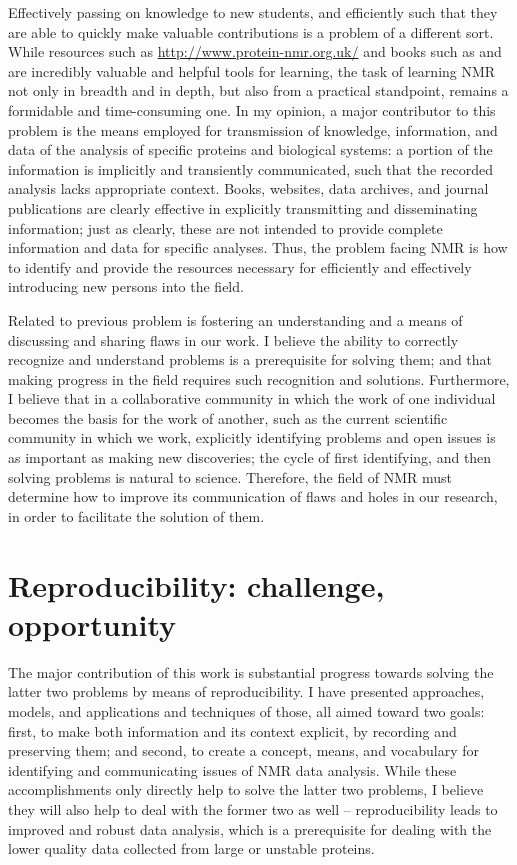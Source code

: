 Effectively passing on knowledge to new students, and efficiently such that
they are able to quickly make valuable contributions is a problem of a different
sort.  While resources such as \url{http://www.protein-nmr.org.uk/} and books
such as \cite{hoch1996nmr} and \cite{keeler2013} are incredibly valuable and
helpful tools for learning, the task of learning NMR not only in breadth and
in depth, but also from a practical standpoint, remains a formidable and
time-consuming one.  In my opinion, a major contributor to this problem is 
the means employed for transmission of knowledge, information, and data of
the analysis of specific proteins and biological systems:
a portion of the information is implicitly and transiently communicated, such 
that the recorded analysis lacks appropriate context.
Books, websites, data archives, and journal publications are clearly effective
in explicitly transmitting and disseminating information; just as clearly,
these are not intended to provide complete information and data for specific
analyses.  Thus, the problem facing
NMR is how to identify and provide the resources necessary for efficiently and
effectively introducing new persons into the field. 

Related to previous problem is fostering an understanding and a means of 
discussing and sharing flaws in our work.  I believe the ability to correctly
recognize and understand problems is a prerequisite for solving them; and that
making progress in the field requires such recognition and solutions.  
Furthermore, I believe that in a collaborative community in which the work of
one individual becomes the basis for the work of another, such as the current
scientific community in which we work, explicitly identifying problems and
open issues is as important as making new discoveries; the cycle of first
identifying, and then solving problems is natural to science.  Therefore, 
the field of NMR must determine how to improve its communication of flaws 
and holes in our research, in order to facilitate the solution of them.


\section{Reproducibility: challenge, opportunity}
The major contribution of this work is substantial progress towards solving
the latter two problems by means of reproducibility.  I have presented 
approaches, models, and applications and techniques of those, all aimed toward
two goals: first, to make both information and its context explicit, by recording
and preserving them; and second, to create a concept, means, and vocabulary for
identifying and communicating issues of NMR data analysis.  While these 
accomplishments only directly help to solve the latter two problems, I believe
they will also help to deal with the former two as well -- reproducibility
leads to improved and robust data analysis, which is a prerequisite for dealing
with the lower quality data collected from large or unstable proteins.


